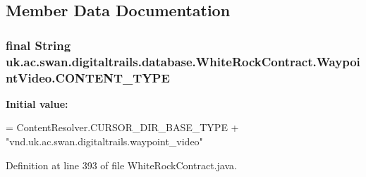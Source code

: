 \subsection{Member Data Documentation}
\hypertarget{classuk_1_1ac_1_1swan_1_1digitaltrails_1_1database_1_1_white_rock_contract_1_1_waypoint_video_a445d2144990a925d7daa165290cf7504}{
\subsubsection[{C\+O\+N\+T\+E\+N\+T\+\_\+\+T\+Y\+P\+E}]{\setlength{\rightskip}{0pt plus 5cm}final String uk.\+ac.\+swan.\+digitaltrails.\+database.\+White\+Rock\+Contract.\+Waypoint\+Video.\+C\+O\+N\+T\+E\+N\+T\+\_\+\+T\+Y\+P\+E\hspace{0.3cm}{\ttfamily [static]}}}\label{classuk_1_1ac_1_1swan_1_1digitaltrails_1_1database_1_1_white_rock_contract_1_1_waypoint_video_a445d2144990a925d7daa165290cf7504}
{\bfseries Initial value\+:}
\begin{DoxyCode}
= ContentResolver.CURSOR\_DIR\_BASE\_TYPE +
                \textcolor{stringliteral}{"vnd.uk.ac.swan.digitaltrails.waypoint\_video"}
\end{DoxyCode}


Definition at line 393 of file White\+Rock\+Contract.\+java.

